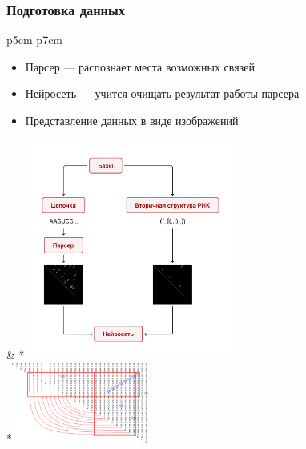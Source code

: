 \documentclass{beamer}
\begin{document}
\begin{frame}[fragile]
\transwipe[direction=90]
\frametitle{Подготовка данных}
\begin{tabular}{p{5cm} p{7cm}}
	\begin{itemize}
		\item Парсер --- распознает места возможных связей
		\item Нейросеть --- учится очищать результат работы парсера
		\item Представление данных в виде изображений
	\end{itemize} &
	*{\!\includegraphics[width=7cm]{pictures/diag2.pdf}}\\
	*{\!\includegraphics[width=4.5cm]{../pics/4.pdf}}
\end{tabular}

\end{frame}
\end{document}
